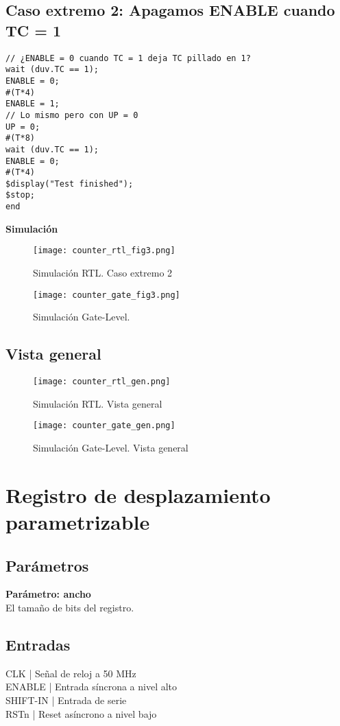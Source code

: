 \documentclass{article}
\newcommand{\iconpath}{/home/khz/git/tabler-icons/icons/outline-white/}
\newcommand{\icon}[1]{}
\begin{document}
\subsection{Caso extremo 2: Apagamos ENABLE cuando TC = 1}
\begin{lstlisting}[style=verilog]
// ¿ENABLE = 0 cuando TC = 1 deja TC pillado en 1?
wait (duv.TC == 1);
ENABLE = 0;
#(T*4)
ENABLE = 1;
// Lo mismo pero con UP = 0
UP = 0;
#(T*8)
wait (duv.TC == 1);
ENABLE = 0;
#(T*4)
$display("Test finished");
$stop;
end
\end{lstlisting}
\newpage
\begin{flushleft}
\textbf{Simulación}
\end{flushleft}
\begin{figure}[h!]
    \centering
    \texttt{[image: counter\_rtl\_fig3.png]} 
    \caption{Simulación RTL. Caso extremo 2}
\end{figure}
\begin{figure}[h!]
    \centering
    \texttt{[image: counter\_gate\_fig3.png]} 
    \caption{Simulación Gate-Level.}
\end{figure}
\subsection{Vista general}
\begin{figure}[h!]
    \centering
    \texttt{[image: counter\_rtl\_gen.png]} 
    \caption{Simulación RTL. Vista general}
\end{figure}
\begin{figure}[h!]
    \centering
    \texttt{[image: counter\_gate\_gen.png]} 
    \caption{Simulación Gate-Level. Vista general}
\end{figure}

\newpage
\section{Registro de desplazamiento parametrizable}
\subsection{Parámetros}
\textbf{Parámetro: ancho} \\
El tamaño de bits del registro.

\subsection{Entradas}
\icon{clock} \icon{s-turn-up} CLK | Señal de reloj a 50 MHz \\
\icon{clock} \icon{s-turn-up} ENABLE | Entrada síncrona a nivel alto \\
\icon{clock} \icon{wave-square} SHIFT-IN | Entrada de serie \\
\icon{clock-off} \icon{s-turn-down} RSTn | Reset asíncrono a nivel bajo \\
\end{document}
